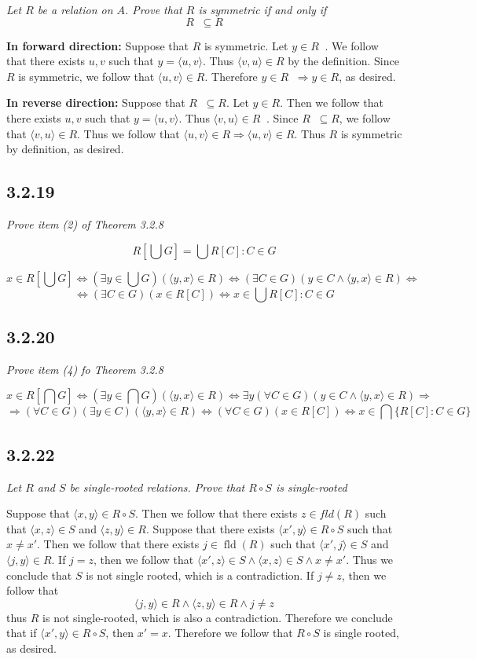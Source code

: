 \documentclass[11pt,oneside,titlepage]{book}
\DeclareMathOperator \fld {fld}
\DeclareMathOperator \inv {^{-1}}
\DeclareMathOperator \lra {\Leftrightarrow}
\DeclareMathOperator \ra {\Rightarrow}
\newcommand{\eangle}[1]{\langle #1 \rangle}
\begin{document}
\textit{Let $R$ be a relation on $A$. Prove that $R$ is symmetric if and only if
  $$R\inv \subseteq R$$}

\textbf{In forward direction: }
Suppose that $R$ is symmetric. 
Let $y \in R \inv$. We follow that there exists $u, v$ such that $y = \eangle{u, v}$.
Thus $\eangle{v, u} \in R$ by the definition. Since $R$ is symmetric, we follow that
$\eangle{u, v} \in R$. Therefore $y \in R\inv \ra y \in R$, as desired.

\textbf{In reverse direction: }
Suppose that $R\inv \subseteq R$. Let $y \in R$. Then we follow that there exists
$u, v$ such that $y = \eangle{u, v}$. Thus $\eangle{v, u} \in R\inv$. Since $R\inv \subseteq R$,
we follow that $\eangle{v, u} \in R$. Thus we follow that $\eangle{u, v} \in R \ra
\eangle{u, v} \in R$. Thus $R$ is symmetric by definition, as desired.

\subsection*{3.2.19}

\textit{Prove item (2) of Theorem 3.2.8}

$$R[\bigcup G] = \bigcup{R[C]: C \in G}$$

$$x \in R[\bigcup G] \lra (\exists y \in \bigcup G)(\eangle{y, x} \in R) \lra
(\exists C \in G)(y \in C \land \eangle{y, x} \in R) \lra$$
$$\lra (\exists C \in G)(x \in R[C]) \lra x \in \bigcup{R[C]: C \in G}$$

\subsection*{3.2.20}

\textit{Prove item (4) fo Theorem 3.2.8}

$$x \in R[\bigcap G] \lra (\exists y \in \bigcap G)(\eangle{y, x} \in R) \lra
\exists y (\forall C \in  G)( y \in C \land \eangle{y, x} \in R) \ra$$
$$ \ra
(\forall C \in G) (\exists y \in C) ( \eangle{y, x} \in R) \lra
(\forall C \in G) (x \in R[C]) \lra x \in \bigcap{\{R[C]: C \in G\}}$$

\subsection*{3.2.22}

\textit{Let $R$ and $S$ be single-rooted relations. Prove that $R \circ S$ is
  single-rooted}

Suppose that $\eangle{x, y} \in R \circ S$. Then we follow that there exists $z \in
fld(R)$ such that
$\eangle{x, z} \in S$ and $\eangle{z, y} \in R$. Suppose that there exists  $\eangle{x', y} \in
R \circ S$ such that $x \neq x'$. Then we follow that there exists $j \in \fld(R)$ such that
$\eangle{x', j} \in S$ and $\eangle{j, y} \in R$. If $j = z$, then we follow that
$\eangle{x', z} \in S \land \eangle{x, z} \in S \land x \neq x'$. Thus we conclude that $S$ is not
single rooted, which is a contradiction. If $j \neq z$, then we follow that
$$\eangle{j, y} \in R \land \eangle{z, y} \in R \land j \neq z$$
thus $R$ is not single-rooted, which is also a contradiction. Therefore we conclude that
if $\eangle{x', y} \in R \circ S$, then $x' = x$. Therefore we follow that $R \circ S$ is
single rooted, as desired.
\end{document}
